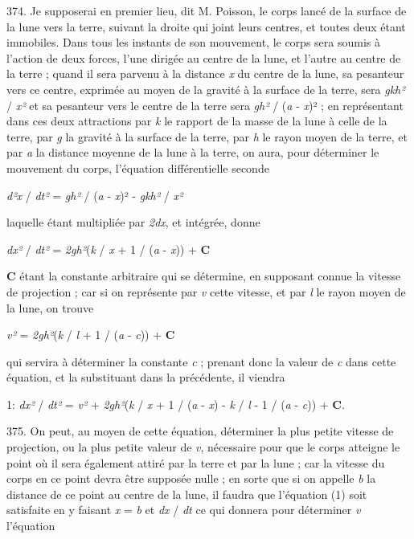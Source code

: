 \documentclass[a4paper, 11pt, oneside, polutonikogreek, french]{article}
\begin{document}
374. \og Je supposerai en premier lieu, dit M. Poisson, le corps lancé de la surface de la lune vers la terre, suivant la droite qui joint leurs centres, et toutes deux étant immobiles. Dans tous les instants de son mouvement, le corps sera soumis à l'action de deux forces, l'une dirigée au centre de la lune, et l'autre au centre de la terre ; quand il sera parvenu à la distance \emph{x} du centre de la lune, sa pesanteur vers ce centre, exprimée au moyen de la gravité à la surface de la terre, sera \emph{gkh²} / \emph{x²} et sa pesanteur vers le centre de la terre sera \emph{gh²} / (\emph{a} - \emph{x})² ; en représentant dans ces deux attractions par \emph{k} le rapport de la masse de la lune à celle de la terre, par \emph{g} la gravité à la surface de la terre, par \emph{h} le rayon moyen de la terre, et par \emph{a} la distance moyenne de la lune à la terre, on aura, pour déterminer le mouvement du corps, l'équation différentielle seconde

\emph{d²x} / \emph{dt²} = \emph{gh²} / (\emph{a} - \emph{x})² - \emph{gkh²} / \emph{x²}

laquelle étant multipliée par \emph{2dx}, et intégrée, donne

\emph{dx²} / \emph{dt²} = \emph{2gh²}(\emph{k} / \emph{x} + 1 / (\emph{a} - \emph{x})) + \textbf{C}

\textbf{C} étant la constante arbitraire qui se détermine, en supposant connue la vitesse de projection ; car si on représente par \emph{v} cette vitesse, et par \emph{l} le rayon moyen de la lune, on trouve

\emph{v²} = \emph{2gh²}(\emph{k} / \emph{l} + 1 / (\emph{a} - \emph{c})) + \textbf{C}

qui servira à déterminer la constante \emph{c} ; prenant donc la valeur de \emph{c} dans cette équation, et la substituant dans la précédente, il viendra

1: \emph{dx²} / \emph{dt²} = \emph{v²} + \emph{2gh²}(\emph{k} / \emph{x} + 1 / (\emph{a} - \emph{x}) - \emph{k} / \emph{l} - 1 / (\emph{a} - \emph{c})) + \textbf{C}.

375. On peut, au moyen de cette équation, déterminer la plus petite vitesse de projection, ou la plus petite valeur de \emph{v}, nécessaire pour que le corps atteigne le point où il sera également attiré par la terre et par la lune ; car la vitesse du corps en ce point devra être supposée nulle ; en sorte que si on appelle \emph{b} la distance de ce point au centre de la lune, il faudra que l'équation (1) soit satisfaite en y faisant \emph{x} = \emph{b} et \emph{dx} / \emph{dt} ce qui donnera pour déterminer \emph{v} l'équation
\end{document}
